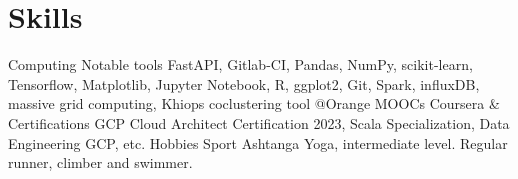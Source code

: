 \documentclass[]{friggeri-cv}
\begin{document}
\section{Skills}
\begin{entrylist}
  \entry
    {Computing}
    {Notable tools}
    {}
    {FastAPI, Gitlab-CI, Pandas, NumPy, scikit-learn, Tensorflow, Matplotlib, Jupyter Notebook, R, ggplot2, Git, Spark, influxDB, massive grid computing, Khiops coclustering tool @Orange}
  \entry
  {}
  {MOOCs Coursera \& Certifications}
  {}
  {GCP Cloud Architect Certification 2023, Scala Specialization, Data Engineering GCP, etc.}
  \entry
    {Hobbies}
    {Sport}
    {}
    {Ashtanga Yoga, intermediate level. Regular runner, climber and swimmer.}
\end{entrylist}
\end{document}
